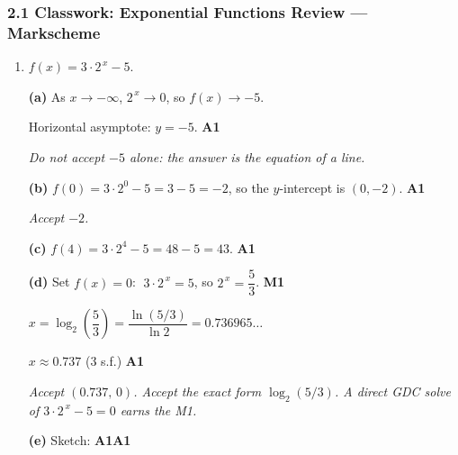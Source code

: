 \documentclass[12pt, twoside]{article}
\begin{document}
\subsubsection*{2.1 Classwork: Exponential Functions Review ---
Markscheme}

\begin{enumerate}[itemsep=0.3cm]

\item[1.] [Maximum mark: 7]

$f(x) = 3 \cdot 2^{\,x} - 5$.

\medskip

\textbf{(a)} As $x \to -\infty$, $2^{\,x} \to 0$, so $f(x) \to -5$.

Horizontal asymptote: $y = -5$. \hfill \textbf{A1}

\emph{Do not accept $-5$ alone: the answer is the equation of a line.}

\medskip

\textbf{(b)} $f(0) = 3 \cdot 2^{0} - 5 = 3 - 5 = -2$, so the
$y$-intercept is $(0, -2)$. \hfill \textbf{A1}

\emph{Accept $-2$.}

\medskip

\textbf{(c)} $f(4) = 3 \cdot 2^{4} - 5 = 48 - 5 = 43$.
\hfill \textbf{A1}

\medskip

\textbf{(d)} Set $f(x) = 0$: $\;3 \cdot 2^{\,x} = 5$, so
$2^{\,x} = \dfrac{5}{3}$. \hfill \textbf{M1}

$x = \log_{2}\!\left(\dfrac{5}{3}\right)
= \dfrac{\ln(5/3)}{\ln 2} = 0.736965\ldots$

$x \approx 0.737$ (3 s.f.) \hfill \textbf{A1}

\emph{Accept $(0.737,\, 0)$. Accept the exact form
$\log_{2}(5/3)$. A direct GDC solve of
$3 \cdot 2^{\,x} - 5 = 0$ earns the M1.}

\medskip

\textbf{(e)} Sketch: \hfill \textbf{A1A1}


\end{enumerate}
\end{document}
